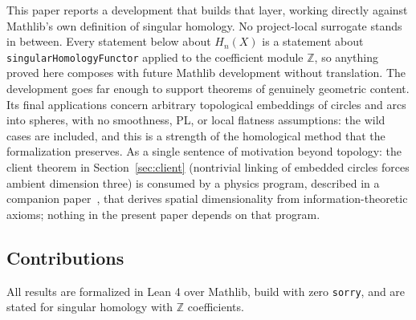 \documentclass[11pt]{article}
\theoremstyle{remark}
\newcommand{\Z}{\mathbb{Z}}
\newcommand{\leanname}[1]{\texttt{#1}}
\begin{document}
This paper reports a development that builds that layer, working directly
against Mathlib's own definition of singular homology. No project-local
surrogate stands in between. Every
statement below about $H_n(X)$ is a statement about
\leanname{singularHomologyFunctor} applied to the coefficient module $\Z$,
so anything proved here composes with future Mathlib development without
translation. The development goes far enough to support theorems of genuinely
geometric content. Its final applications concern arbitrary topological
embeddings of circles and arcs into spheres, with no smoothness, PL, or
local flatness assumptions: the wild cases are included, and this is a
strength of the homological method that the formalization preserves. As a
single sentence of motivation beyond topology: the client theorem in
Section~\ref{sec:client} (nontrivial linking of embedded circles forces
ambient dimension three) is consumed by a physics program, described in a
companion paper~\cite{companion}, that derives spatial dimensionality from
information-theoretic axioms; nothing in the present paper depends on that
program.

\subsection{Contributions}

All results are formalized in Lean 4 over Mathlib, build with zero
\texttt{sorry}, and are stated for singular homology with $\Z$ coefficients.
\end{document}
